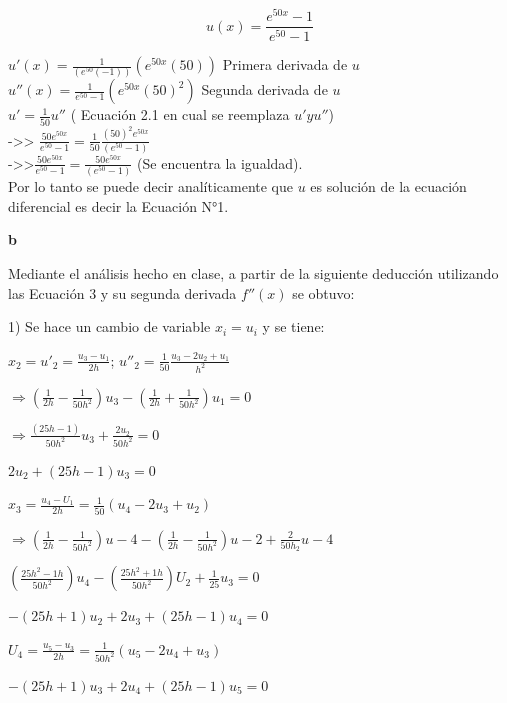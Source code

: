 \documentclass[paper=a4, parskip=full, fontsize=12pt]{scrartcl} %
\numberwithin{equation}{section} %
\numberwithin{figure}{section} %
\numberwithin{table}{section} %
\begin{document}
\[u(x)=\frac { { e }^{ 50x }-1 }{ { e }^{ 50 }-1 }\] 

$u'(x)=\frac { 1 }{ ({ e }^{ 50 }(-1)) } ({ e }^{ 50x }(50))$ Primera derivada de $u$\\

$u''(x)=\frac { 1 }{ { e }^{ 50 }-1 } ({ e }^{ 50x }(50)^{ 2 })$ Segunda derivada de $u$\\
 
$u'=\frac { 1 }{ 50 } u''$ ( Ecuaci\'on 2.1 en cual se reemplaza $u' y u''$)\\ 

->> $\frac { 50{ e }^{ 50x } }{ { e }^{ 50 }-1 } =\frac { 1 }{ 50 } \frac { (50)^{ 2 }{ e }^{ 50x } }{ ({ e }^{ 50 }-1) } $\\

->>$\frac { 50{ e }^{ 50x } }{ { e }^{ 50 }-1 } =\frac { 50{ e }^{ 50x } }{ ({ e }^{ 50 }-1) }$ (Se encuentra la igualdad). \\

Por lo tanto se puede decir anal\'iticamente que $u$ es soluci\'on de la ecuaci\'on diferencial es decir la Ecuaci\'on N°1.

\textbf{b} 

Mediante el an\'alisis hecho en clase, a partir de la siguiente deducci\'on utilizando las Ecuaci\'on 3 y su segunda derivada $f''(x)$ se obtuvo:

1) Se hace un cambio de variable $x_{i}=u_{i}$ y  se tiene:
\begin{center}
$x_{2}=u'_{2}=\frac{u_{3}-u_{1}}{2h}$; $u''_{2}=\frac{1}{50}\frac{u_{3}-2u_{2}+u_{1}}{h^{2}}$
\end{center}
\begin{center}
$\Rightarrow\left( \frac{1}{2h}-\frac{1}{50h^{2}}\right)u_{3}-\left(\frac{1}{2h}+\frac{1}{50h^{2}}\right)u_{1}=0$
\end{center}
\begin{center}
$\Rightarrow\frac{(25h-1)}{50h^{2}}u_{3}+\frac{2u_{2}}{50h^{2}}=0$
\end{center}
\begin{center}
$\boxed{{2u_{2}+(25h-1)u_{3}=0}}$
\end{center}
\begin{center}
$x_{3}=\frac{u_{4}-U_{1}}{2h}=\frac{1}{50}(u_{4}-2u_{3}+u_{2})$
\end{center}
\begin{center}
$\Rightarrow\left(\frac{1}{2h}-\frac{1}{50h^{2}}\right)u-{4}-\left(\frac{1}{2h}-\frac{1}{50h^{2}}\right)u-{2}+\frac{2}{50h_{2}}u-{4}$
\end{center}
\begin{center}
$\left(\frac{25h^{2}-1h}{50h^{2}}\right)u_{4}-\left(\frac{25h^{2}+1h}{50h^{2}}\right)U_{2}+\frac{1}{25}u_{3}=0$
\end{center}
\begin{center}
$\boxed{-(25h+1)u_{2}+2u_{3}+(25h-1)u_{4}=0}$
\end{center}
\begin{center}
$U_{4}=\frac{u_{5}-u_{3}}{2h}=\frac{1}{50h^{2}}(u_{5}-2u_{4}+u_{3})$
\end{center}
\begin{center}
$\boxed{-(25h+1)u_{3}+2u_{4}+(25h-1)u_{5}=0}$
\end{center}
\
\end{document}
